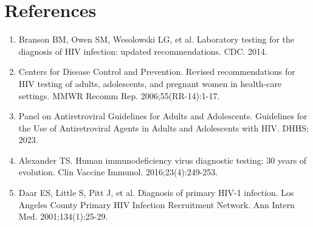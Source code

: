 \section*{References}
\begin{enumerate}
  \item Branson BM, Owen SM, Wesolowski LG, et al. Laboratory testing for the diagnosis of HIV infection: updated recommendations. CDC. 2014.
  \item Centers for Disease Control and Prevention. Revised recommendations for HIV testing of adults, adolescents, and pregnant women in health-care settings. MMWR Recomm Rep. 2006;55(RR-14):1-17.
  \item Panel on Antiretroviral Guidelines for Adults and Adolescents. Guidelines for the Use of Antiretroviral Agents in Adults and Adolescents with HIV. DHHS; 2023.
  \item Alexander TS. Human immunodeficiency virus diagnostic testing: 30 years of evolution. Clin Vaccine Immunol. 2016;23(4):249-253.
  \item Daar ES, Little S, Pitt J, et al. Diagnosis of primary HIV-1 infection. Los Angeles County Primary HIV Infection Recruitment Network. Ann Intern Med. 2001;134(1):25-29.
\end{enumerate}

\clearpage
